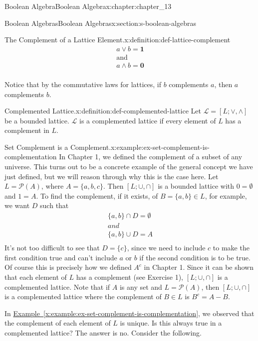 \documentclass[oneside,10pt,]{book}
\newcommand{\xreffont}{\relax}
\numberwithin{equation}{section}
\begin{document}
\begin{chapterptx}{Boolean Algebra}{}{Boolean Algebra}{}{}{x:chapter:chapter_13}
\begin{sectionptx}{Boolean Algebras}{}{Boolean Algebras}{}{}{x:section:s-boolean-algebras}
\begin{definition}{The Complement of a Lattice Element.}{x:definition:def-lattice-complement}
\begin{equation*}
\begin{array}{c}
a \lor b = \pmb{1}\\
\textrm{and}\\
a \land b =\pmb{0}\\
\end{array}
\end{equation*}
%
\end{definition}
Notice that by the commutative laws for lattices, if \(b\) complements \(a\), then \(a\) complements \(b\).%
\begin{definition}{Complemented Lattice.}{x:definition:def-complemented-lattice}%
%
Let \(\mathcal{L}=[L; \lor ,\land ]\) be a bounded lattice.   \(\mathcal{L}\) is a complemented lattice if every element of \(L\) has a complement in \(L\).%
\end{definition}
\begin{example}{Set Complement is a Complement.}{x:example:ex-set-complement-is-complementation}%
In Chapter 1, we defined the complement of a subset of any universe.   This turns out to be a concrete example of the general concept we have just defined, but we will reason through why this is the case here.  Let \(L = \mathcal{P}(A)\), where \(A = \{a, b, c\}\). Then \([L; \cup  , \cap ]\) is a bounded lattice with \(0 = \emptyset\) and \(1 = A\). To find the complement, if it exists, of \(B = \{a, b\} \in  L\), for example, we want \(D\) such that%
\begin{equation*}
\begin{array}{c}
\{a,b\} \cap D = \emptyset\\ 
and\\
\{a,b\} \cup  D = A\\
\end{array}
\end{equation*}
It's not too difficult to see that  \(D = \{c\}\), since we need to include \(c\) to make the first condition true and can't include \(a\) or \(b\) if the second condition is to be true.  Of course this is precisely how we defined \(A^c\) in Chapter 1.  Since it can be shown that each element of \(L\) has a complement (see Exercise 1), \([L; \cup  , \cap ]\) is a complemented lattice. Note that if \(A\) is any set and \(L = \mathcal{P}(A)\), then \([L; \cup  , \cap ]\) is a complemented lattice where the complement of \(B \in  L\) is \(B ^c = A - B\).%
\end{example}
In \hyperref[x:example:ex-set-complement-is-complementation]{Example~{\xreffont\ref{x:example:ex-set-complement-is-complementation}}}, we observed that the complement of each element of \(L\) is unique. Is this always true in a complemented lattice? The answer is no. Consider the following.%

\end{sectionptx}
\end{chapterptx}
\end{document}
